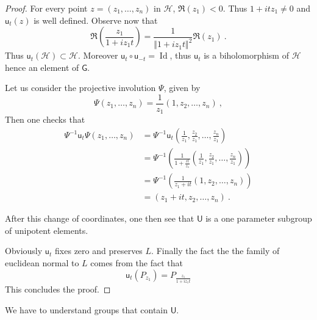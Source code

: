 \documentclass[12pt,reqno]{amsart}
\newcommand{\mG}{\ms G}
\newcommand{\ms}{\mathsf}
\newcommand{\mc}{\mathcal}
\newcommand{\id}{\operatorname{Id}}
\newcommand{\uu}{\mathsf u}
\newcommand{\mU}{\mathsf U}
\begin{document}
\begin{proof}
	For every point $z=(z_1,\ldots,z_n)$ in $\mc H$, $\Re(z_1)<0$. Thus $1+itz_1\not=0$ and $\uu_t(z)$ is well defined.
	Observe now that 
	$$
	\Re\left(\frac{z_1}{1+iz_1t}\right)=\frac{1}{\Vert 1+iz_1t\Vert^2}\Re(z_1)\ .
	$$
	Thus $\uu_t(\mc H)\subset \mc H$. Moreover $\uu_t\circ \uu_{-t}=\id$, thus $\uu_t$ is a biholomorphism of $\mc H$ hence an element of $\mG$.
	
	Let us consider the projective involution $\Psi$, given by 
	$$
\Psi(z_1,\ldots,z_n)=\frac{1}{z_1}\left(1,z_2,\ldots,z_n\right)\ ,
	$$
	Then one checks that 
\begin{align}
\Psi^{-1}\uu_t\Psi(z_1,\ldots,z_n)&=\Psi^{-1}\uu_t\left(\frac{1}{z_1},\frac{z_2}{z_1},\ldots,\frac{z_n}{z_1}\right)
\\&=
\Psi^{-1}\left(\frac{1}{1 +\frac{it}{z_1}}\left(\frac{1}{z_1},\frac{z_2}{z_1},\ldots,\frac{z_n}{z_1}\right)\right)
\\&=
\Psi^{-1}\left(\frac{1}{z_1 +it}\left(1,z_2,\ldots,z_n\right)\right)
\\&=(z_1+it, z_2,\ldots,z_n)\ .\end{align}

After this change of coordinates, one then see that $\mU$ is a one parameter subgroup of unipotent elements.  
	
Obviously $\uu_t$ fixes zero and preserves $L$. Finally the fact the the family of euclidean normal to $L$ comes from the fact that 
	$$
	\uu_t(P_{z_1})= P_{\frac{z_1}{1+iz_1t}}
	$$	
	This concludes the proof.	
\end{proof}
We have to understand groups that contain $\mU$.
\end{document}
